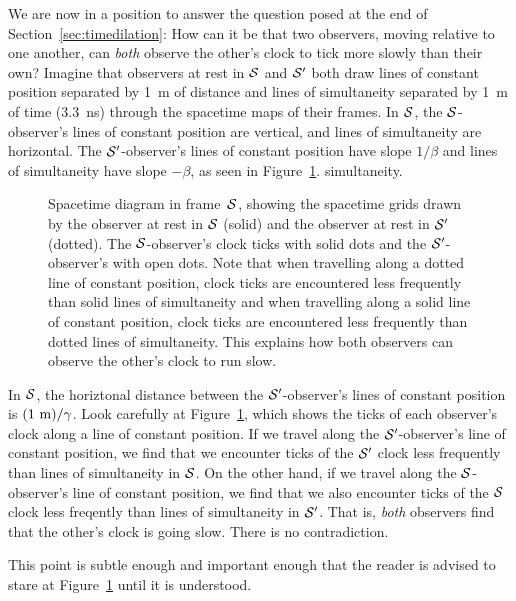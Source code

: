 We are now in a position to answer the question posed at the end of
Section~\ref{sec:timedilation}: How can it be that two observers,
moving relative to one another, can {\em both} observe the other's
clock to tick more slowly than their own?  Imagine that observers at
rest in $\cal S$ and $\cal S'$ both draw lines of constant position
separated by 1~m of distance and lines of simultaneity separated by
1~m of time (3.3~ns) through the spacetime maps of their frames.  In
$\cal S$, the $\cal S$-observer's lines of constant position are
vertical, and lines of simultaneity are horizontal.  The
$\cal S'$-observer's lines of constant position have slope $1/\beta$
and lines of simultaneity have slope $-\beta$, as seen in
Figure~\ref{fig:bothgrids}.
simultaneity.
\begin{figure}
\caption{Spacetime diagram in frame~$\cal S$, showing the spacetime
grids drawn by the observer at rest in $\cal S$ (solid) and the
observer at rest in $\cal S'$ (dotted).  The $\cal S$-observer's
clock ticks with solid dots and the $\cal S'$-observer's with open
dots.  Note that when travelling along a dotted line of constant
position, clock ticks are encountered less frequently than solid lines
of simultaneity and when travelling along a solid line of constant
position, clock ticks are encountered less frequently than dotted
lines of simultaneity.  This explains how both observers can observe
the other's clock to run slow.}
\label{fig:bothgrids}
\end{figure}
In $\cal S$, the horiztonal distance between the
$\cal S'$-observer's lines of constant position is $(1~{\rm
m})/\gamma$.  Look carefully at Figure~\ref{fig:bothgrids}, which
shows the ticks of each observer's clock along a line of constant
position.  If we travel along the $\cal S'$-observer's line of
constant position, we find that we encounter ticks of the $\cal S'$
clock less frequently than lines of simultaneity in $\cal S$.  On the
other hand, if we travel along the $\cal S$-observer's line of
constant position, we find that we also encounter ticks of the
$\cal S$ clock less freqently than lines of simultaneity in
$\cal S'$.  That is, {\em both\/} observers find that the other's
clock is going slow.  There is no contradiction.

This point is subtle enough and important enough that the reader is
advised to stare at Figure~\ref{fig:bothgrids} until it is understood.

